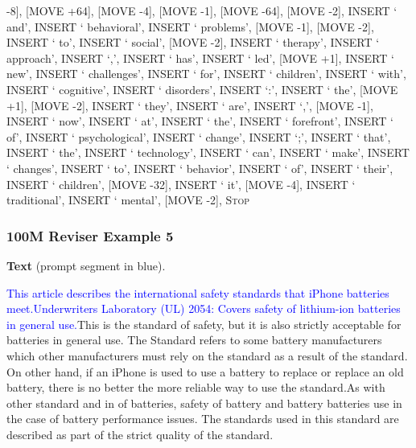 \documentclass[11pt]{article}
\DeclareRobustCommand{\Stop}{\ifmmode\text{\textsc{Stop}}\else\textsc{Stop}\fi}
\begin{document}
{-8], [MOVE +64], [MOVE -4], [MOVE -1], [MOVE -64], [MOVE -2], INSERT ` and', INSERT ` behavioral', INSERT ` problems', [MOVE -1], [MOVE -2], INSERT ` to', INSERT ` social', [MOVE -2], INSERT ` therapy', INSERT ` approach', INSERT `,', INSERT ` has', INSERT ` led', [MOVE +1], INSERT ` new', INSERT ` challenges', INSERT ` for', INSERT ` children', INSERT ` with', INSERT ` cognitive', INSERT ` disorders', INSERT `:', INSERT ` the', [MOVE +1], [MOVE -2], INSERT ` they', INSERT ` are', INSERT `,', [MOVE -1], INSERT ` now', INSERT ` at', INSERT ` the', INSERT ` forefront', INSERT ` of', INSERT ` psychological', INSERT ` change', INSERT `;', INSERT ` that', INSERT ` the', INSERT ` technology', INSERT ` can', INSERT ` make', INSERT ` changes', INSERT ` to', INSERT ` behavior', INSERT ` of', INSERT ` their', INSERT ` children', [MOVE -32], INSERT ` it', [MOVE -4], INSERT ` traditional', INSERT ` mental', [MOVE -2], \Stop\par
}
\vspace{0.8em}
\subsubsection*{100M Reviser Example 5}
\textbf{Text} (prompt segment in blue).\par
\ttfamily\small \textcolor{blue}{This article describes the international safety standards that iPhone batteries meet.\newline Underwriters Laboratory (UL) 2054: Covers safety of lithium-ion batteries in general use.\newline }This is the standard of safety, but it is also strictly acceptable for batteries in general use. The Standard refers to some battery manufacturers which other manufacturers must rely on the standard as a result of the standard. On other hand, if an iPhone is used to use a battery to replace or replace an old battery, there is no better the more reliable way to use the standard.\newline As with other standard and in of batteries, safety of battery and battery batteries use in the case of battery performance issues. The standards used in this standard are described as part of the strict quality of the standard.
\end{document}
